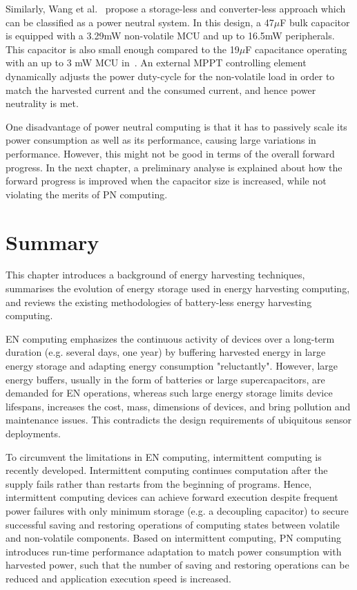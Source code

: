 Similarly, Wang et al.~\cite{wang2016storage} propose a storage-less and converter-less approach which can be classified as a power neutral system. In this design, a 47$\mu$F bulk capacitor is equipped with a 3.29mW non-volatile MCU and up to 16.5mW peripherals. This capacitor is also small enough compared to the 19$\mu$F capacitance operating with an up to 3 mW MCU in~\cite{balsamo2016graceful}. An external MPPT controlling element dynamically adjusts the power duty-cycle for the non-volatile load in order to match the harvested current and the consumed current, and hence power neutrality is met. 

One disadvantage of power neutral computing is that it has to passively scale its power consumption as well as its performance, causing large variations in performance. However, this might not be good in terms of the overall forward progress. In the next chapter, a preliminary analyse is explained about how the forward progress is improved when the capacitor size is increased, while not violating the merits of PN computing. 

\section{Summary}

This chapter introduces a background of energy harvesting techniques, summarises the evolution of energy storage used in energy harvesting computing, and reviews the existing methodologies of battery-less energy harvesting computing. 

EN computing emphasizes the continuous activity of devices over a long-term duration (e.g. several days, one year) by buffering harvested energy in large energy storage and adapting energy consumption "reluctantly". However, large energy buffers, usually in the form of batteries or large supercapacitors, are demanded for EN operations, whereas such large energy storage limits device lifespans, increases the cost, mass, dimensions of devices, and bring pollution and maintenance issues. This contradicts the design requirements of ubiquitous sensor deployments. 

To circumvent the limitations in EN computing, intermittent computing is recently developed. Intermittent computing continues computation after the supply fails rather than restarts from the beginning of programs. Hence, intermittent computing devices can achieve forward execution despite frequent power failures with only minimum storage (e.g. a decoupling capacitor) to secure successful saving and restoring operations of computing states between volatile and non-volatile components. Based on intermittent computing, PN computing introduces run-time performance adaptation to match power consumption with harvested power, such that the number of saving and restoring operations can be reduced and application execution speed is increased. 

